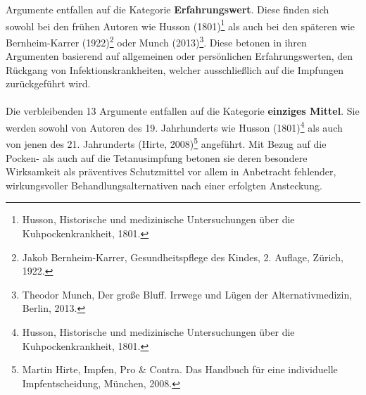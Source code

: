 \documentclass[
    a4paper,
    12pt,
    hyphens,
    chapterprefix=true,
    headheight=33pt,
    footheight=29pt,
    headings=optiontohead, %
]{scrartcl}
\begin{document}
{ Argumente entfallen auf die Kategorie \textbf{Erfahrungswert}. Diese finden sich sowohl bei den frühen Autoren wie Husson (1801)\footnote{Husson, Historische und medizinische Untersuchungen über die Kuhpockenkrankheit, 1801.} als auch bei den späteren wie
Bernheim-Karrer (1922)\footnote{Jakob Bernheim-Karrer, Gesundheitspflege des Kindes, 2. Auflage, Zürich, 1922.} oder Munch (2013)\footnote{Theodor Munch, Der große Bluff. Irrwege und Lügen der Alternativmedizin, Berlin, 2013.}. Diese betonen in ihren Argumenten basierend auf allgemeinen oder persönlichen Erfahrungswerten, den Rückgang von Infektionskrankheiten, welcher ausschließlich auf die Impfungen zurückgeführt wird.\\
\\
Die verbleibenden 13 Argumente entfallen auf die Kategorie \textbf{einziges Mittel}. Sie werden sowohl von Autoren des 19. Jahrhunderts wie Husson (1801)\footnote{Husson, Historische und medizinische Untersuchungen über die Kuhpockenkrankheit, 1801.} als auch von jenen des 21. Jahrunderts (Hirte, 2008)\footnote{Martin Hirte, Impfen, Pro \& Contra. Das Handbuch für eine individuelle Impfentscheidung, München, 2008.} angeführt. Mit Bezug auf die Pocken- als auch auf die Tetanusimpfung betonen sie deren besondere Wirksamkeit als präventives Schutzmittel vor allem in Anbetracht fehlender, wirkungsvoller Behandlungsalternativen nach einer erfolgten Ansteckung.

}
\end{document}
